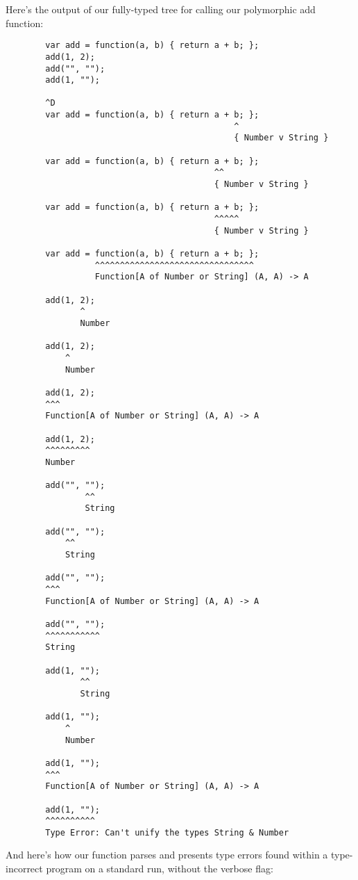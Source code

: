 \documentclass[british, twoside, openright]{bhamthesis}
\theoremstyle{definition}
\begin{document}
      Here's the output of our fully-typed tree for calling our polymorphic add function:
      \begin{lstlisting}
        var add = function(a, b) { return a + b; };
        add(1, 2);
        add("", "");
        add(1, "");

        ^D
        var add = function(a, b) { return a + b; };
                                              ^
                                              { Number v String }

        var add = function(a, b) { return a + b; };
                                          ^^
                                          { Number v String }

        var add = function(a, b) { return a + b; };
                                          ^^^^^
                                          { Number v String }

        var add = function(a, b) { return a + b; };
                  ^^^^^^^^^^^^^^^^^^^^^^^^^^^^^^^^
                  Function[A of Number or String] (A, A) -> A

        add(1, 2);
               ^
               Number

        add(1, 2);
            ^
            Number

        add(1, 2);
        ^^^
        Function[A of Number or String] (A, A) -> A

        add(1, 2);
        ^^^^^^^^^
        Number

        add("", "");
                ^^
                String

        add("", "");
            ^^
            String

        add("", "");
        ^^^
        Function[A of Number or String] (A, A) -> A

        add("", "");
        ^^^^^^^^^^^
        String

        add(1, "");
               ^^
               String

        add(1, "");
            ^
            Number

        add(1, "");
        ^^^
        Function[A of Number or String] (A, A) -> A

        add(1, "");
        ^^^^^^^^^^
        Type Error: Can't unify the types String & Number
      \end{lstlisting}

      And here's how our function parses and presents type errors found within a type-incorrect program on a standard run, without the verbose flag:
\end{document}
